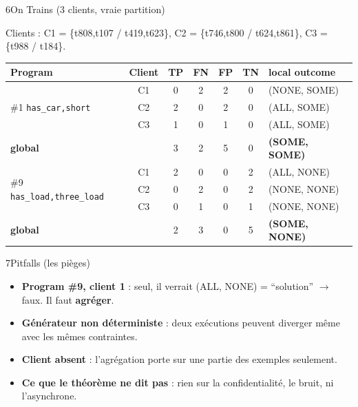 \documentclass[10pt]{article}
\begin{document}
\vspace{4pt}

\begin{minipage}[t]{0.58\textwidth}
\begin{bloc}{\num{6}On Trains (3 clients, vraie partition)}
{\scriptsize
Clients : C1 = \{t808,t107 / t419,t623\}, C2 = \{t746,t800 / t624,t861\}, C3 = \{t988 / t184\}.\par\vspace{2pt}
\renewcommand{\arraystretch}{1.1}
\begin{tabular}{@{}l c c c c c l@{}}
\textbf{Program} & \textbf{Client} & TP & FN & FP & TN & \textbf{local outcome}\\\hline
\multirow{3}{*}{\#1 \texttt{has\_car,short}} & C1 & 0 & 2 & 2 & 0 & (NONE, SOME)\\
 & C2 & 2 & 0 & 2 & 0 & (ALL, SOME)\\
 & C3 & 1 & 0 & 1 & 0 & (ALL, SOME)\\
\textbf{global} & & 3 & 2 & 5 & 0 & \textbf{(SOME, SOME)}\\\hline
\multirow{3}{*}{\#9 \texttt{has\_load,three\_load}} & C1 & 2 & 0 & 0 & 2 & (ALL, NONE)\\
 & C2 & 0 & 2 & 0 & 2 & (NONE, NONE)\\
 & C3 & 0 & 1 & 0 & 1 & (NONE, NONE)\\
\textbf{global} & & 2 & 3 & 0 & 5 & \textbf{(SOME, NONE)}\\
\end{tabular}}
\end{bloc}
\end{minipage}\hfill
\begin{minipage}[t]{0.4\textwidth}
\begin{bloc}{\num{7}Pitfalls (les pièges)}
\begin{itemize}
  \item \textbf{Program \#9, client 1} : seul, il verrait (ALL, NONE) = ``solution'' $\to$ faux. Il faut \textbf{agréger}.
  \item \textbf{Générateur non déterministe} : deux exécutions peuvent diverger même avec les mêmes contraintes.
  \item \textbf{Client absent} : l'agrégation porte sur une partie des exemples seulement.
  \item \textbf{Ce que le théorème ne dit pas} : rien sur la confidentialité, le bruit, ni l'asynchrone.
\end{itemize}
\end{bloc}
\end{minipage}
\end{document}
